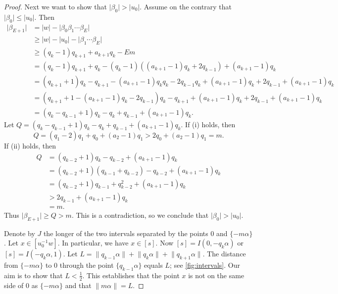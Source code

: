 \documentclass[a4paper,fleqn]{article}
\providecommand{\abs}[1]{\lvert#1\rvert}
\providecommand{\norm}[1]{\lVert#1\rVert}
\begin{document}
\begin{proof}
    Next we want to show that $\abs{\beta_0} > \abs{u_0}$. Assume on the contrary that $\abs{\beta_0} \leq \abs{u_0}$.
    Then
    \begin{align*}
      \abs{\beta_{E+1}} &= \abs{w} - \abs{\beta_0 \beta_1 \dotsm \beta_E} \\
                        &\geq \abs{w} - \abs{u_0} - \abs{\beta_1 \dotsm \beta_E} \\
                        &\geq (q_k - 1)q_{k+1} + a_{k+1}q_k - Em \\
                        &= (q_k - 1)q_{k+1} + q_k - (q_k - 1)((a_{k+1} - 1)q_k + 2q_{k-1}) + (a_{k+1} - 1)q_k \\
                        &= (q_{k+1} + 1)q_k - q_{k+1} - (a_{k+1} - 1)q_k q_k - 2q_{k-1}q_k + (a_{k+1} - 1)q_k + 2q_{k-1} + (a_{k+1} - 1)q_k \\
                        &= (q_{k+1} + 1 - (a_{k+1} - 1)q_k - 2q_{k-1})q_k - q_{k+1} + (a_{k+1} - 1)q_k + 2q_{k-1} + (a_{k+1} - 1)q_k \\
                        &= (q_k - q_{k-1} + 1)q_k - q_k + q_{k-1} + (a_{k+1} - 1)q_k.
    \end{align*}
    Let $Q = (q_k - q_{k-1} + 1)q_k - q_k + q_{k-1} + (a_{k+1} - 1)q_k$. If (i) holds, then
    \begin{equation*}
      Q = (q_1 - 2)q_1 + q_0 + (a_2 - 1)q_1 > 2q_0 + (a_2 - 1)q_1 = m.
    \end{equation*}
    If (ii) holds, then
    \begin{align*}
      Q &= (q_{k-2} + 1)q_k - q_{k-2} + (a_{k+1} - 1)q_k \\
        &= (q_{k-2} + 1)(q_{k-1} + q_{k-2}) - q_{k-2} + (a_{k+1} - 1)q_k \\
        &= (q_{k-2} + 1)q_{k-1} + q_{k-2}^2 + (a_{k+1} - 1)q_k \\
        &> 2q_{k-1} + (a_{k+1} - 1)q_k \\
        &= m.
    \end{align*}
    Thus $\abs{\beta_{E+1}} \geq Q > m$. This is a contradiction, so we conclude that $\abs{\beta_0} > \abs{u_0}$.

    Denote by $J$ the longer of the two intervals separated by the points $0$ and $\{-m\alpha\}$. Let
    $x \in [u_0^{-1} w]$. In particular, we have $x \in [s]$. Now $[s] = I(0, -q_k\alpha)$ or $[s] = I(-q_k\alpha, 1)$.
    Let $L = \norm{q_{k-1}\alpha} + \norm{q_k\alpha} + \norm{q_{k+1}\alpha}$. The distance from $\{-m\alpha\}$ to $0$
    through the point $\{q_{k-1}\alpha\}$ equals $L$; see \autoref{fig:intervals}. Our aim is to show that
    $L < \tfrac12$. This establishes that the point $x$ is not on the same side of $0$ as $\{-m\alpha\}$ and that
    $\norm{m\alpha} = L$.
    

\end{proof}
\end{document}
